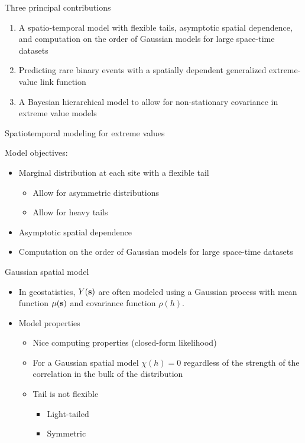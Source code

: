 \documentclass{beamer}
\begin{document}
\begin{frame}{Three principal contributions}
\begin{adjustwidth}{1em}{0em}
  \begin{enumerate}[1.] \setlength{\itemsep}{1.5em}
    \item A spatio-temporal model with flexible tails, asymptotic spatial dependence, and computation on the order of Gaussian models for large space-time datasets
    \item Predicting rare binary events with a spatially dependent generalized extreme-value link function
    \item A Bayesian hierarchical model to allow for non-stationary covariance in extreme value models
  \end{enumerate}
\end{adjustwidth}
\end{frame}

\begin{frame}{Spatiotemporal modeling for extreme values}
\begin{adjustwidth}{1em}{0em}
  Model objectives: \vspace{1em}
  \begin{itemize} \setlength{\itemsep}{1em} \setlength{\itemindent}{1em}
    \item Marginal distribution at each site with a flexible tail
    \begin{itemize}
      \item Allow for asymmetric distributions
      \item Allow for heavy tails
    \end{itemize}
    \item Asymptotic spatial dependence
    \item Computation on the order of Gaussian models for large space-time datasets
  \end{itemize}
\end{adjustwidth}
\end{frame}

\begin{frame}{Gaussian spatial model}
  \begin{itemize} \setlength{\itemsep}{1em}
    \item In geostatistics, $Y(\mbox{\bf s})$ are often modeled using a Gaussian process with mean function $\mu(\mbox{\bf s})$ and covariance function $\rho(h)$.
    \item Model properties
    \begin{itemize}
      \item Nice computing properties (closed-form likelihood)
      \item For a Gaussian spatial model $\chi(h) = 0$ regardless of the strength of the correlation in the bulk of the distribution
      \item Tail is not flexible
      \begin{itemize}
        \item Light-tailed
        \item Symmetric
      \end{itemize}
    \end{itemize}
  \end{itemize}
\end{frame}
\end{document}
